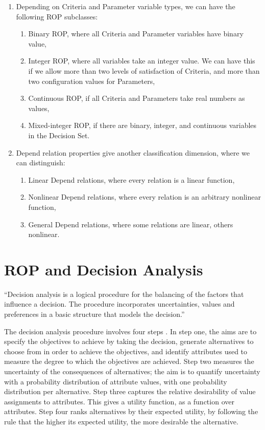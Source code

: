 \documentclass[graybox]{svmult}
\newcommand{\Criteria}{Criteria}
\newcommand{\Parameter}{Parameter}
\newcommand{\Depend}{Depend}
\newcommand{\ROP}{ROP}
\newcommand{\DecisionSet}{Decision Set}
\begin{document}
\begin{enumerate}
    \item{Depending on \Criteria{} and \Parameter{} variable types, we can have the following \ROP{} subclasses:
    \begin{enumerate}
        \item{Binary \ROP, where all \Criteria{} and \Parameter{} variables have binary value,}
        \item{Integer \ROP, where all variables take an integer value. We can have this if we allow more than two levels of satisfaction of \Criteria, and more than two configuration values for \Parameter s,}
        \item{Continuous \ROP, if all Criteria and Parameters take real numbers as values,}
        \item{Mixed-integer \ROP, if there are binary, integer, and continuous variables in the \DecisionSet.}
    \end{enumerate}
    }
    \item{\Depend{} relation properties give another classification dimension, where we can distinguish:
    \begin{enumerate}
        \item{Linear \Depend{} relations, where every relation is a linear function,}
        \item{Nonlinear \Depend{} relations, where every relation is an arbitrary nonlinear function,}
        \item{General \Depend{} relations, where some relations are linear, others nonlinear.}
    \end{enumerate}
    }
\end{enumerate}



%
\section{\ROP{} and Decision Analysis}\label{s:decision-analysis}
``Decision analysis is a logical procedure for the balancing of the factors that influence a decision. The procedure incorporates uncertainties, values and preferences in a basic structure that models the decision.'' \cite{howard1966decision}

The decision analysis procedure involves four steps \cite{keeney1982decision, keeney1993decisions}. In step one, the aims are to specify the objectives to achieve by taking the decision, generate alternatives to choose from in order to achieve the objectives, and identify attributes used to measure the degree to which the objectives are achieved. Step two measures the uncertainty of the consequences of alternatives; the aim is to quantify uncertainty with a probability distribution of attribute values, with one probability distribution per alternative. Step three captures the relative desirability of value assignments to attributes. This gives a utility function, as a function over attributes. Step four ranks alternatives by their expected utility, by following the rule that the higher its expected utility, the more desirable the alternative. 
\end{document}
